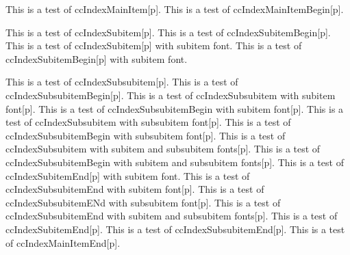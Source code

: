 \documentclass{article}
\begin{document}
{{{{\pagebreak

This is a test of ccIndexMainItem[p].
This is a test of ccIndexMainItemBegin[p].

This is a test of ccIndexSubitem[p].
This is a test of ccIndexSubitemBegin[p].
This is a test of ccIndexSubitem[p] with subitem font.
This is a test of ccIndexSubitemBegin[p] with subitem font.

This is a test of ccIndexSubsubitem[p].
This is a test of ccIndexSubsubitemBegin[p].
This is a test of ccIndexSubsubitem with subitem font[p].
This is a test of ccIndexSubsubitemBegin with subitem font[p].
This is a test of ccIndexSubsubitem with subsubitem font[p].
This is a test of ccIndexSubsubitemBegin with subsubitem font[p].
This is a test of ccIndexSubsubitem with subitem and subsubitem fonts[p].
This is a test of ccIndexSubsubitemBegin with subitem and subsubitem fonts[p].
\pagebreak
This is a test of ccIndexSubitemEnd[p] with subitem font.
This is a test of ccIndexSubsubitemEnd with subitem font[p].
This is a test of ccIndexSubsubitemENd with subsubitem font[p].
This is a test of ccIndexSubsubitemEnd with subitem and subsubitem fonts[p].
This is a test of ccIndexSubitemEnd[p].
This is a test of ccIndexSubsubitemEnd[p].
This is a test of ccIndexMainItemEnd[p].

}}}}
\end{document}
